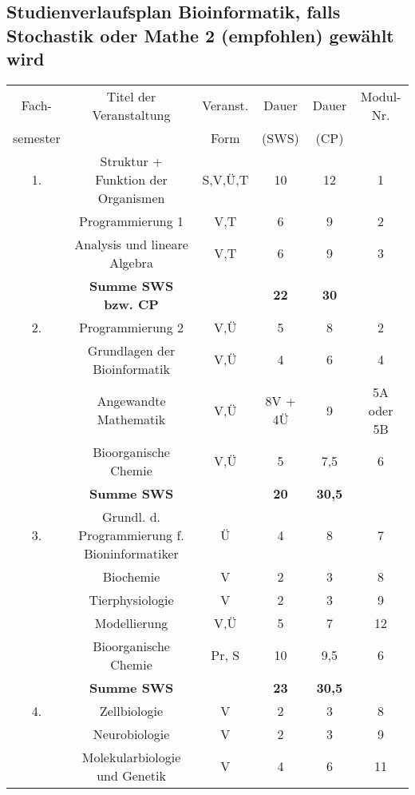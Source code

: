 
\begin{addmargin}[-5mm]{0cm}

\subsection{Studienverlaufsplan Bioinformatik, falls Stochastik oder Mathe 2 (empfohlen) gewählt wird}

\begin{center}

\begin{tabular}{|c|cc|c|c|c|}
\hline Fach- & Titel der Veranstaltung & Veranst. & Dauer & Dauer & Modul-Nr. \\ 
 semester &  & Form & (SWS) & (CP) &  \\ 
\hline 1. & Struktur + Funktion der Organismen & S,V,Ü,T & 10 & 12 & 1 \\ 
\hline  & Programmierung 1 & V,T & 6 & 9 & 2 \\ 
\hline  & Analysis und lineare Algebra & V,T & 6 & 9 & 3 \\ 
\hline  & \textbf{Summe SWS bzw. CP} &  & \textbf{22} & \textbf{30} &  \\ 
\hline 2. & Programmierung 2 & V,Ü & 5 & 8 & 2 \\ 
\hline  & Grundlagen der Bioinformatik & V,Ü & 4 & 6 & 4 \\ 
\hline  & Angewandte Mathematik & V,Ü & 8V + 4Ü & 9 & 5A oder 5B \\ 
\hline  & Bioorganische Chemie & V,Ü & 5 & 7,5 & 6 \\ 
\hline  & \textbf{Summe SWS}&  & \textbf{20} & \textbf{30,5} &  \\ 
\hline 3. & Grundl. d. Programmierung f. Bioninformatiker & Ü & 4 & 8 & 7 \\ 
\hline  & Biochemie & V & 2 & 3 & 8 \\
        & Tierphysiologie & V & 2 & 3 & 9 \\ 
\hline  & Modellierung & V,Ü & 5 & 7 & 12 \\ 
\hline  & Bioorganische Chemie & Pr, S & 10 & 9,5 & 6 \\ 
\hline  & \textbf{Summe SWS}&  & \textbf{23} & \textbf{30,5} &  \\ 
\hline 4. & Zellbiologie & V & 2 & 3 & 8 \\ 
\hline  & Neurobiologie & V & 2 & 3 & 9 \\ 
\hline  & Molekularbiologie und Genetik & V & 4 & 6 & 11 \\ 

\end{tabular}
\end{center}
\end{addmargin}
